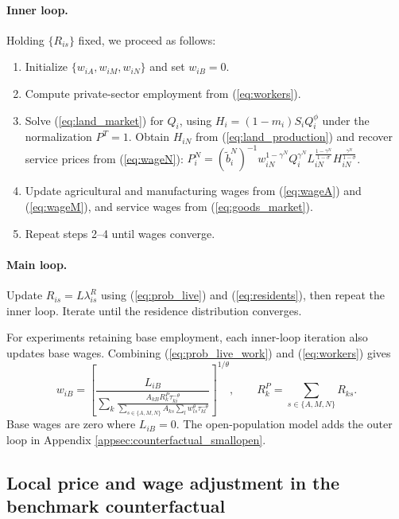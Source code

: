 \documentclass[12pt, unicode, a4paper]{article}
\newcommand{\1}{\mbox{1}\hspace{-0.25em}\mbox{l}} %
\begin{document}
\paragraph{Inner loop.}
Holding $\{R_{is}\}$ fixed, we proceed as follows:
\begin{enumerate}
    \item Initialize $\{w_{iA},w_{iM},w_{iN}\}$ and set $w_{iB}=0$.
    \item Compute private-sector employment from (\ref{eq:workers}).
    \item Solve (\ref{eq:land_market}) for $Q_i$, using $H_i=(1-m_i)S_iQ_i^\phi$ under the normalization $P^T=1$. Obtain $H_{iN}$ from (\ref{eq:land_production}) and recover service prices from (\ref{eq:wageN}): $        P_i^N=(\widetilde b_i^N)^{-1}w_{iN}^{1-\gamma^N}Q_i^{\gamma^N}
        L_{iN}^{\frac{1-\gamma^N}{1-\sigma}}H_{iN}^{\frac{\gamma^N}{1-\sigma}}$.
    \item Update agricultural and manufacturing wages from (\ref{eq:wageA}) and (\ref{eq:wageM}), and service wages from (\ref{eq:goods_market}).
    \item Repeat steps 2--4 until wages converge.
\end{enumerate}

\paragraph{Main loop.}
Update $R_{is}=L\lambda_{is}^R$ using (\ref{eq:prob_live}) and (\ref{eq:residents}), then repeat the inner loop. Iterate until the residence distribution converges.

For experiments retaining base employment, each inner-loop iteration also updates base wages. Combining (\ref{eq:prob_live_work}) and (\ref{eq:workers}) gives
\begin{equation*}
    w_{iB}=\left[
        \frac{L_{iB}}{\displaystyle\sum_k
        \frac{A_{kB}R_k^P\tau_{ki}^{-\theta}}
        {\sum_{s\in\{A,M,N\}}A_{ks}\sum_l w_{ls}^\theta\tau_{kl}^{-\theta}}}
    \right]^{1/\theta},
    \qquad R_k^P=\sum_{s\in\{A,M,N\}}R_{ks}.
\end{equation*}
Base wages are zero where $L_{iB}=0$. The open-population model adds the outer loop in Appendix \ref{appsec:counterfactual_smallopen}.

\clearpage

\subsection{Local price and wage adjustment in the benchmark counterfactual}\label{appsec:counterfactual_prices}
\end{document}
